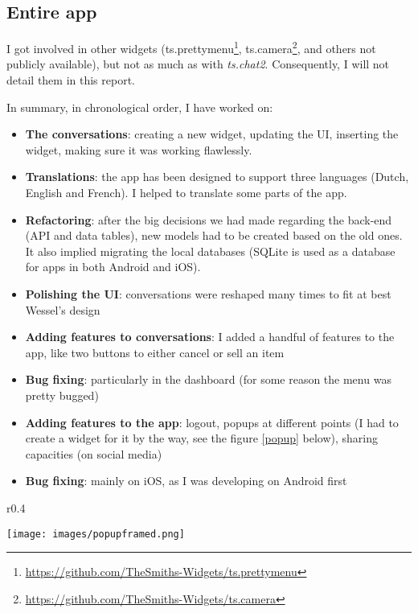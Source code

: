 \subsection{Entire app}

I got involved in other widgets (ts.prettymenu\footnote{\href{https://github.com/TheSmiths-Widgets/ts.prettymenu}{https://github.com/TheSmiths-Widgets/ts.prettymenu}}, ts.camera\footnote{\href{https://github.com/TheSmiths-Widgets/ts.camera}{https://github.com/TheSmiths-Widgets/ts.camera}}, and others not publicly available), but not as much as with \textit{ts.chat2}. Consequently, I will not detail them in this report.

\medskip

In summary, in chronological order, I have worked on:
\begin{itemize}
  \item \textbf{The conversations}: creating a new widget, updating the UI, inserting the widget, making sure it was working flawlessly.
  \item \textbf{Translations}: the app has been designed to support three languages (Dutch, English and French). I helped to translate some parts of the app.
  \item \textbf{Refactoring}: after the big decisions we had made regarding the back-end (API and data tables), new models had to be created based on the old ones. It also implied migrating the local databases (SQLite is used as a database for apps in both Android and iOS).
  \item \textbf{Polishing the UI}: conversations were reshaped many times to fit at best Wessel's design
  \item \textbf{Adding features to conversations}: I added a handful of features to the app, like two buttons to either cancel or sell an item
  \item \textbf{Bug fixing}: particularly in the dashboard (for some reason the menu was pretty bugged)
  \item \textbf{Adding features to the app}: logout, popups at different points (I had to create a widget for it by the way, see the figure \ref{popup} below), sharing capacities (on social media)
  \item \textbf{Bug fixing}: mainly on iOS, as I was developing on Android first
\end{itemize}
\begin{wrapfigure}{r}{0.4\textwidth}
  \vspace{-10pt} %
  \begin{center}
    \texttt{[image: images/popupframed.png]}
  \end{center}
  \caption[KopenVerkopen -- Popup]{The popup showing social media icons}\label{popup}
  \vspace{-60pt} %
\end{wrapfigure}

